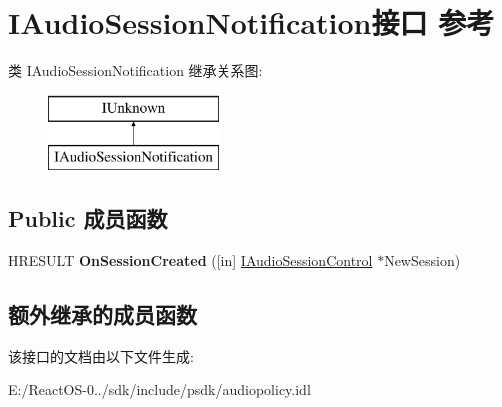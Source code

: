 \hypertarget{interface_i_audio_session_notification}{}\section{I\+Audio\+Session\+Notification接口 参考}
\label{interface_i_audio_session_notification}
类 I\+Audio\+Session\+Notification 继承关系图\+:\begin{figure}[H]
\begin{center}
\leavevmode
\includegraphics[height=2.000000cm]{interface_i_audio_session_notification}
\end{center}
\end{figure}
\subsection*{Public 成员函数}
\begin{DoxyCompactItemize}
\item 
\mbox{\label{interface_i_audio_session_notification_acb075f2c94babeb6dc26eacf1f9943ad}} 
H\+R\+E\+S\+U\+LT {\bfseries On\+Session\+Created} (\mbox{[}in\mbox{]} \hyperlink{interface_i_audio_session_control}{I\+Audio\+Session\+Control} $\ast$New\+Session)
\end{DoxyCompactItemize}
\subsection*{额外继承的成员函数}


该接口的文档由以下文件生成\+:\begin{DoxyCompactItemize}
\item 
E\+:/\+React\+O\+S-\/0../sdk/include/psdk/audiopolicy.\+idl\end{DoxyCompactItemize}
